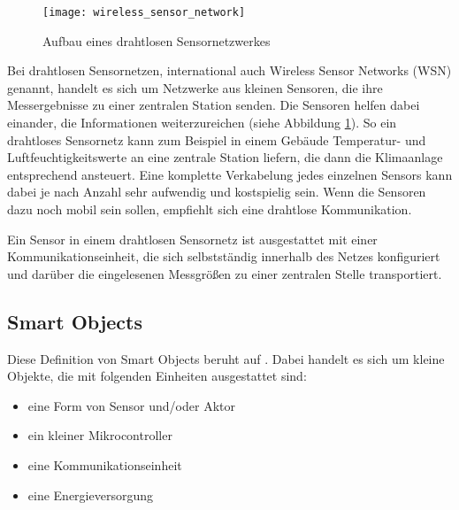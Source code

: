 \begin{figure}[htbp]
	\centering
	\texttt{[image: wireless\_sensor\_network]}
	\caption{Aufbau eines drahtlosen Sensornetzwerkes}
	\label{fig:wsn}
\end{figure}

Bei drahtlosen Sensornetzen, international auch Wireless Sensor Networks (WSN) genannt, handelt es sich um Netzwerke aus kleinen Sensoren, die ihre Messergebnisse zu einer zentralen Station senden. Die Sensoren helfen dabei einander, die Informationen weiterzureichen (siehe Abbildung \ref{fig:wsn}). So ein drahtloses Sensornetz kann zum Beispiel in einem Gebäude Temperatur- und Luftfeuchtigkeitswerte an eine zentrale Station liefern, die dann die Klimaanlage entsprechend ansteuert. Eine komplette Verkabelung jedes einzelnen Sensors kann dabei je nach Anzahl sehr aufwendig und kostspielig sein. Wenn die Sensoren dazu noch mobil sein sollen, empfiehlt sich eine drahtlose Kommunikation.

Ein Sensor in einem drahtlosen Sensornetz ist ausgestattet mit einer Kommunikationseinheit, die sich selbstständig innerhalb des Netzes konfiguriert und darüber die eingelesenen Messgrößen zu einer zentralen Stelle transportiert.


\subsection{Smart Objects}\label{Smart Objects}

Diese Definition von Smart Objects  beruht auf \textcite{vasseur10interconnecting}. Dabei handelt es sich um kleine Objekte, die mit folgenden Einheiten ausgestattet sind:

\begin{itemize}
	\itemsep 0pt
	\item eine Form von Sensor und/oder Aktor
	\item ein kleiner Mikrocontroller
	\item eine Kommunikationseinheit
	\item eine Energieversorgung
\end{itemize}

